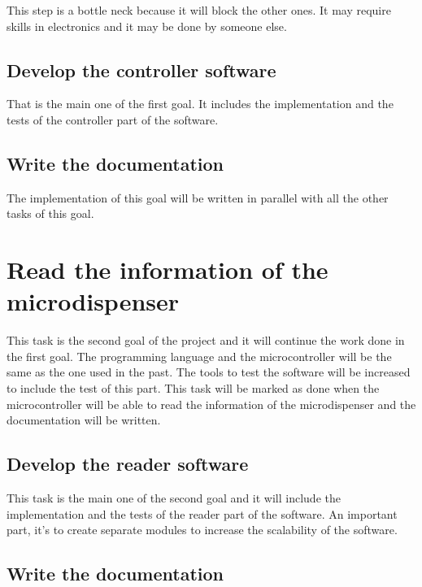 This step is a bottle neck because it will block the other ones.
It may require skills in electronics and it may be done by someone else.

\subsection{Develop the controller software}
\label{sec:activities:control:software}

That is the main one of the first goal.
It includes the implementation and the tests of the controller part of the software.

\subsection{Write the documentation}
\label{sec:activities:control:documentation}

The implementation of this goal will be written in parallel with all the other tasks of this goal.



\section{Read the information of the microdispenser}
\label{sec:activities:read}

This task is the second goal of the project and it will continue the work done in the first goal.
The programming language and the microcontroller will be the same as the one used in the past.
The tools to test the software will be increased to include the test of this part.
This task will be marked as done when the microcontroller will be able to read the information of the microdispenser and the documentation will be written.


\subsection{Develop the reader software}
\label{sec:activities:read:software}

This task is the main one of the second goal and it will include the implementation and the tests of the reader part of the software.
An important part, it's to create separate modules to increase the scalability of the software.

\subsection{Write the documentation}
\label{sec:activities:read:documentation}

